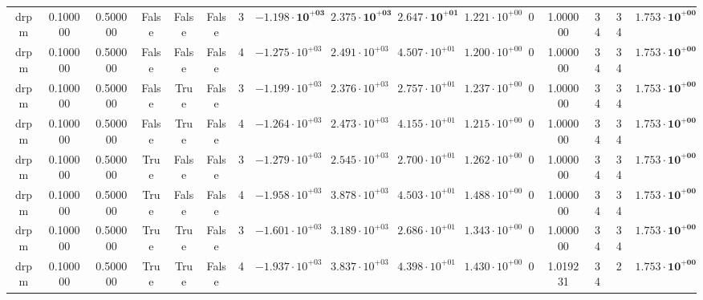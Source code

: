 \begin{table}
\begin{tabular}{cccccccccccccccc}
drpm & 0.100000 & 0.500000 & False & False & False & 3 & $\mathbf{-1.198 \cdot 10^{+03}}$ & $\mathbf{2.375 \cdot 10^{+03}}$ & $\mathbf{2.647 \cdot 10^{+01}}$ & $1.221 \cdot 10^{+00}$ & 0 & 1.000000 & 34 & 34 & $\mathbf{1.753 \cdot 10^{+00}}$ \\
drpm & 0.100000 & 0.500000 & False & False & False & 4 & $-1.275 \cdot 10^{+03}$ & $2.491 \cdot 10^{+03}$ & $4.507 \cdot 10^{+01}$ & $1.200 \cdot 10^{+00}$ & 0 & 1.000000 & 34 & 34 & $\mathbf{1.753 \cdot 10^{+00}}$ \\
drpm & 0.100000 & 0.500000 & False & True & False & 3 & $-1.199 \cdot 10^{+03}$ & $2.376 \cdot 10^{+03}$ & $2.757 \cdot 10^{+01}$ & $1.237 \cdot 10^{+00}$ & 0 & 1.000000 & 34 & 34 & $\mathbf{1.753 \cdot 10^{+00}}$ \\
drpm & 0.100000 & 0.500000 & False & True & False & 4 & $-1.264 \cdot 10^{+03}$ & $2.473 \cdot 10^{+03}$ & $4.155 \cdot 10^{+01}$ & $1.215 \cdot 10^{+00}$ & 0 & 1.000000 & 34 & 34 & $\mathbf{1.753 \cdot 10^{+00}}$ \\
drpm & 0.100000 & 0.500000 & True & False & False & 3 & $-1.279 \cdot 10^{+03}$ & $2.545 \cdot 10^{+03}$ & $2.700 \cdot 10^{+01}$ & $1.262 \cdot 10^{+00}$ & 0 & 1.000000 & 34 & 34 & $\mathbf{1.753 \cdot 10^{+00}}$ \\
drpm & 0.100000 & 0.500000 & True & False & False & 4 & $-1.958 \cdot 10^{+03}$ & $3.878 \cdot 10^{+03}$ & $4.503 \cdot 10^{+01}$ & $1.488 \cdot 10^{+00}$ & 0 & 1.000000 & 34 & 34 & $\mathbf{1.753 \cdot 10^{+00}}$ \\
drpm & 0.100000 & 0.500000 & True & True & False & 3 & $-1.601 \cdot 10^{+03}$ & $3.189 \cdot 10^{+03}$ & $2.686 \cdot 10^{+01}$ & $1.343 \cdot 10^{+00}$ & 0 & 1.000000 & 34 & 34 & $\mathbf{1.753 \cdot 10^{+00}}$ \\
drpm & 0.100000 & 0.500000 & True & True & False & 4 & $-1.937 \cdot 10^{+03}$ & $3.837 \cdot 10^{+03}$ & $4.398 \cdot 10^{+01}$ & $1.430 \cdot 10^{+00}$ & 0 & 1.019231 & 34 & 2 & $\mathbf{1.753 \cdot 10^{+00}}$ \\
\bottomrule
\end{tabular}
\end{table}
